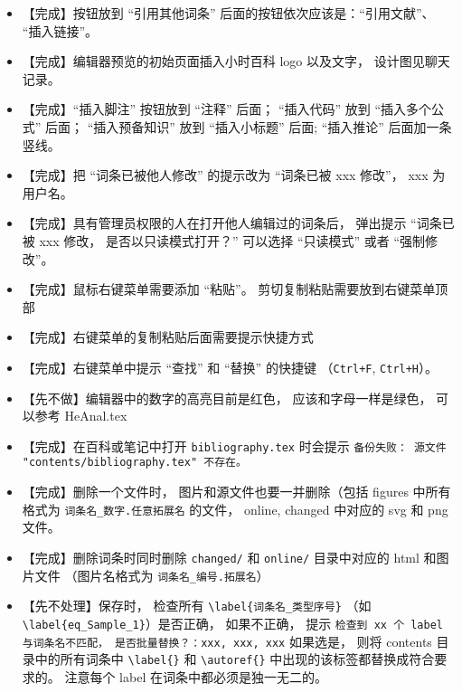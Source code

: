 \begin{itemize}
\item 【完成】按钮放到 “引用其他词条” 后面的按钮依次应该是：“引用文献”、 “插入链接”。

\item 【完成】编辑器预览的初始页面插入小时百科 logo 以及文字， 设计图见聊天记录。

\item 【完成】“插入脚注” 按钮放到 “注释” 后面； “插入代码” 放到 “插入多个公式” 后面； “插入预备知识” 放到 “插入小标题” 后面; “插入推论” 后面加一条竖线。

\item 【完成】把 “词条已被他人修改” 的提示改为 “词条已被 xxx 修改”， xxx 为用户名。

\item 【完成】具有管理员权限的人在打开他人编辑过的词条后， 弹出提示 “词条已被 xxx 修改， 是否以只读模式打开？” 可以选择 “只读模式” 或者 “强制修改”。

\item 【完成】鼠标右键菜单需要添加 “粘贴”。 剪切复制粘贴需要放到右键菜单顶部

\item 【完成】右键菜单的复制粘贴后面需要提示快捷方式

\item 【完成】右键菜单中提示 “查找” 和 “替换” 的快捷键 （\verb|Ctrl+F|, \verb|Ctrl+H|）。

\item 【先不做】编辑器中的数字的高亮目前是红色， 应该和字母一样是绿色， 可以参考 HeAnal.tex

\item 【完成】在百科或笔记中打开 \verb|bibliography.tex| 时会提示 \verb|备份失败： 源文件 "contents/bibliography.tex" 不存在。|

\item 【完成】删除一个文件时， 图片和源文件也要一并删除（包括 figures 中所有格式为 \verb|词条名_数字.任意拓展名| 的文件， online, changed 中对应的 svg 和 png 文件。

\item 【完成】删除词条时同时删除 \verb|changed/| 和 \verb|online/| 目录中对应的 html 和图片文件 （图片名格式为 \verb|词条名_编号.拓展名|）

\item 【先不处理】保存时， 检查所有 \verb|\label{词条名_类型序号}| （如 \verb|\label{eq_Sample_1}|）是否正确， 如果不正确， 提示 \verb|检查到 xx 个 label 与词条名不匹配， 是否批量替换？：xxx, xxx, xxx| 如果选是， 则将 contents 目录中的所有词条中 \verb|\label{}| 和 \verb|\autoref{}| 中出现的该标签都替换成符合要求的。 注意每个 label 在词条中都必须是独一无二的。


\end{itemize}
